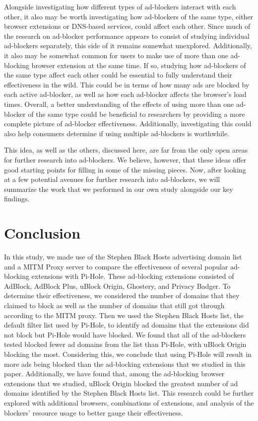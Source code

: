 \documentclass[sigsmall]{acmart}
\begin{document}
Alongside investigating how different types of ad-blockers interact with each other, it also may be worth investigating how ad-blockers of the same type, either browser extensions or DNS-based services, could affect each other. Since much of the research on ad-blocker performance appears to consist of studying individual ad-blockers separately, this side of it remains somewhat unexplored. Additionally, it also may be somewhat common for users to make use of more than one ad-blocking browser extension at the same time. If so, studying how ad-blockers of the same type affect each other could be essential to fully understand their effectiveness in the wild. This could be in terms of how many ads are blocked by each active ad-blocker, as well as how each ad-blocker affects the browser’s load times. Overall, a better understanding of the effects of using more than one ad-blocker of the same type could be beneficial to researchers by providing a more complete picture of ad-blocker effectiveness. Additionally, investigating this could also help consumers determine if using multiple ad-blockers is worthwhile.

This idea, as well as the others, discussed here, are far from the only open areas for further research into ad-blockers. We believe, however, that these ideas offer good starting points for filling in some of the missing pieces. Now, after looking at a few potential avenues for further research into ad-blockers, we will summarize the work that we performed in our own study alongside our key findings.

\section*{Conclusion}
In this study, we made use of the Stephen Black Hosts advertising domain list and a MITM Proxy server to compare the effectiveness of several popular ad-blocking extensions with Pi-Hole. These ad-blocking extensions consisted of AdBlock, AdBlock Plus, uBlock Origin, Ghostery, and Privacy Badger. To determine their effectiveness, we considered the number of domains that they claimed to block as well as the number of domains that still got through according to the MITM proxy. Then we used the Stephen Black Hosts list, the default filter list used by Pi-Hole, to identify ad domains that the extensions did not block but Pi-Hole would have blocked. We found that all of the ad-blockers tested blocked fewer ad domains from the list than Pi-Hole, with uBlock Origin blocking the most. Considering this, we conclude that using Pi-Hole will result in more ads being blocked than the ad-blocking extensions that we studied in this paper. Additionally, we have found that, among the ad-blocking browser extensions that we studied, uBlock Origin blocked the greatest number of ad domains identified by the Stephen Black Hosts list. This research could be further explored with additional browsers, combinations of extensions, and analysis of the blockers' resource usage to better gauge their effectiveness. 



\end{document}
